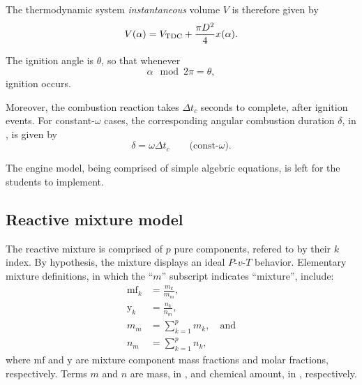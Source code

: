     The thermodynamic system \emph{instantaneous} volume $V$ is therefore given by%
    \begin{equation}
        \label{eq:V}
        V(\alpha) = V_{\mbox{\scriptsize TDC}} + \frac{\pi D^2}{4}x(\alpha).
    \end{equation}

    The ignition angle is $\theta$, so that whenever%
    \begin{equation}
        \alpha\!\!\!\mod{2\pi} = \theta,
        \label{eq:theta}
    \end{equation}
    \noindent ignition occurs.

    Moreover, the combustion reaction takes $\Delta t_c$ seconds to complete, after ignition events. For constant-$\omega$ cases, the corresponding angular  combustion  duration  $\delta$,  in
    \radian, is given by%
    \begin{equation}
        \delta = \omega\Delta t_c \qquad\mbox{(const-$\omega$).}
        \label{eq:delta}
    \end{equation}

    The engine model, being comprised of simple algebric equations, is left for the students to implement.


    \subsection{Reactive mixture model}\label{sec:model.reactm}

    The reactive mixture is comprised of $p$ pure components, refered to by their $k$ index. By hypothesis, the mixture displays an ideal $P$-$v$-$T$ behavior. Elementary mixture  definitions,
    in which the ``$m$'' subscript indicates ``mixture'', include:%
    \begin{align}
        \label{eq:mf}
        \mathrm{mf}_k   &= \frac{m_k}{m_m}, \\
        \label{eq:y}
        \mathrm{y}_k    &= \frac{n_k}{n_m}, \\
        \label{eq:mm}
        m_m             &= \sum_{k=1}^p m_k, \quad\mbox{and} \\
        \label{eq:nm}
        n_m             &= \sum_{k=1}^p n_k,
    \end{align}
    \noindent where $\mathrm{mf}$ and $\mathrm{y}$ are mixture component mass fractions and molar fractions, respectively. Terms $m$ and $n$ are mass, in \kilogram,  and  chemical  amount,  in
    \kilo\mole, respectively.

